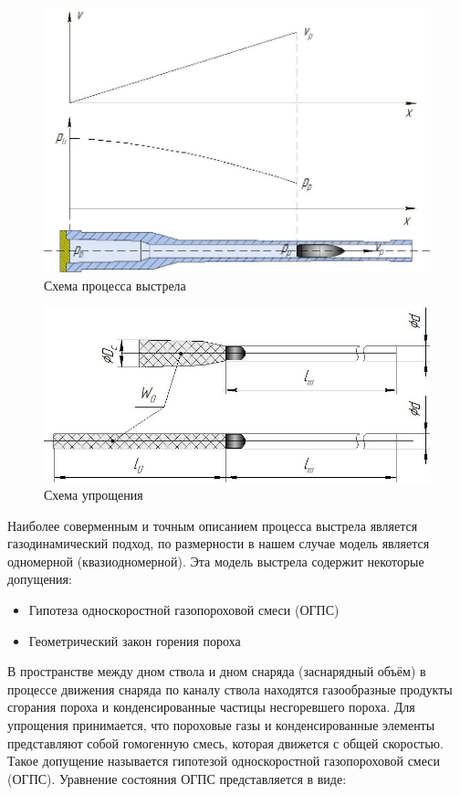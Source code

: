 \documentclass[14pt, a4paper]{report} %
\begin{document}
\begin{figure}[h!]
\centering
\includegraphics[width=0.45\textheight]{imgs/1.jpg}
\caption{Схема процесса выстрела}
\end{figure}

\begin{figure}[h]
\centering
\includegraphics[width=0.5\textheight]{imgs/2.jpg}
\caption{Схема упрощения}
\end{figure}

Наиболее соверменным и точным описанием процесса выстрела является газодинамический подход, 
по размерности в нашем случае модель является одномерной (квазиодномерной). Эта модель выстрела содержит некоторые допущения: 
\begin{itemize}
    \item Гипотеза односкоростной газопороховой смеси (ОГПС)
    \item Геометрический закон горения пороха
\end{itemize}


    В пространстве между дном ствола и дном снаряда (заснарядный объём) в процессе движения снаряда 
по каналу ствола находятся газообразные продукты сгорания пороха и конденсированные частицы несгоревшего пороха.
Для упрощения принимается, что пороховые газы и конденсированные элементы представляют собой гомогенную смесь, которая движется 
с общей скоростью. Такое допущение называется гипотезой односкоростной газопороховой смеси (ОГПС). Уравнение состояния ОГПС представляется в виде: 
\end{document}
